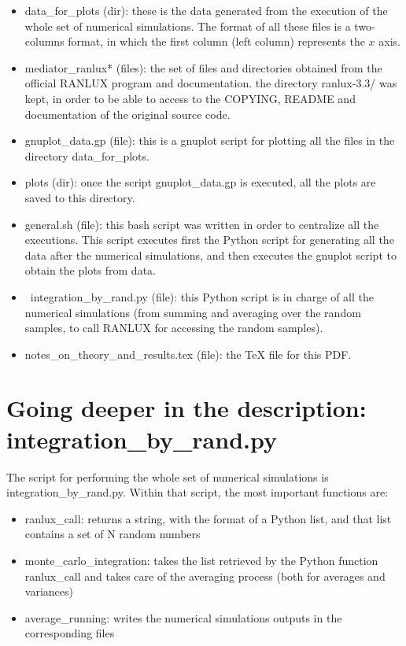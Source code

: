 \documentclass[paper=a4, fontsize=11pt]{scrartcl} %
\numberwithin{equation}{section} %
\numberwithin{figure}{section} %
\numberwithin{table}{section} %
\begin{document}
\begin{itemize}
\item data\_for\_plots (dir): these is the data generated from the execution of the whole set of numerical simulations. The format of all these files is a two-columns format, in which the first column (left column) represents the $x$ axis.
\item mediator\_ranlux* (files): the set of files and directories obtained from the official RANLUX program and documentation. the directory ranlux-3.3/ was kept, in order to be able to access to the COPYING, README and documentation of the original source code.
\item gnuplot\_data.gp (file): this is a gnuplot script for plotting all the files in the directory data\_for\_plots.
\item plots (dir): once the script gnuplot\_data.gp is executed, all the plots are saved to this directory.
\item general.sh (file): this bash script was written in order to centralize all the executions. This script executes first the Python script for generating all the data after the numerical simulations, and then executes the gnuplot script to obtain the plots from data.
\item\ integration\_by\_rand.py (file): this Python script is in charge of all the numerical simulations (from summing and averaging over the random samples, to call RANLUX for accessing the random samples).
\item notes\_on\_theory\_and\_results.tex (file): the TeX file for this PDF.
\end{itemize}


\section{Going deeper in the description: integration\_by\_rand.py}


The script for performing the whole set of numerical simulations is integration\_by\_rand.py. Within that script, the most important functions are:

\begin{itemize}
\item ranlux\_call: returns a string, with the format of a Python list, and that list contains a set of N random numbers
\item monte\_carlo\_integration: takes the list retrieved by the Python function ranlux\_call and takes care of the averaging process (both for averages and variances)
\item average\_running: writes the numerical simulations outputs in the corresponding files
\end{itemize}
\end{document}

